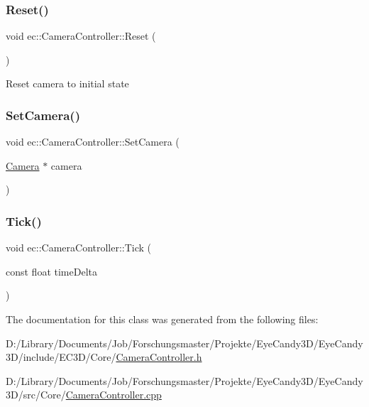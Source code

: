 \mbox{\label{classec_1_1_camera_controller_aad9552da91386535de9dc1b106f941aa}} 
\subsubsection{\texorpdfstring{Reset()}{Reset()}}
{\footnotesize\ttfamily void ec\+::\+Camera\+Controller\+::\+Reset (\begin{DoxyParamCaption}{ }\end{DoxyParamCaption})}

Reset camera to initial state \mbox{\label{classec_1_1_camera_controller_a3cbf6829af7035fa648ef9283f1f6b34}} 
\subsubsection{\texorpdfstring{Set\+Camera()}{SetCamera()}}
{\footnotesize\ttfamily void ec\+::\+Camera\+Controller\+::\+Set\+Camera (\begin{DoxyParamCaption}\item[{\mbox{\hyperlink{classec_1_1_camera}{Camera}} $\ast$}]{camera }\end{DoxyParamCaption})}

\mbox{\label{classec_1_1_camera_controller_a0f9378014e5501eec0af79fd7006a4d7}} 
\subsubsection{\texorpdfstring{Tick()}{Tick()}}
{\footnotesize\ttfamily void ec\+::\+Camera\+Controller\+::\+Tick (\begin{DoxyParamCaption}\item[{const float}]{time\+Delta }\end{DoxyParamCaption})}



The documentation for this class was generated from the following files\+:\begin{DoxyCompactItemize}
\item 
D\+:/\+Library/\+Documents/\+Job/\+Forschungsmaster/\+Projekte/\+Eye\+Candy3\+D/\+Eye\+Candy3\+D/include/\+E\+C3\+D/\+Core/\mbox{\hyperlink{_camera_controller_8h}{Camera\+Controller.\+h}}\item 
D\+:/\+Library/\+Documents/\+Job/\+Forschungsmaster/\+Projekte/\+Eye\+Candy3\+D/\+Eye\+Candy3\+D/src/\+Core/\mbox{\hyperlink{_camera_controller_8cpp}{Camera\+Controller.\+cpp}}\end{DoxyCompactItemize}
